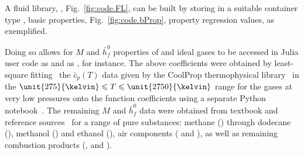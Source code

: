     A fluid library, , Fig.~\ref{fig:code.FL}, can be built by storing in a suitable container type ,  basic  properties,  Fig.~\ref{fig:code.bProp},  property  regression
    values, as exemplified.


    Doing so allows for $M$ and $\bar{h}_f^0$ properties of  and  ideal gases to be accessed in Julia user code as  and as , for  instance.  The
    above    coefficients  were  obtained  by  least-square  fitting~\cite{2007-PressWH+FlanneryBP-Cambridge}  the  $\bar{c}_p(T)$  data  given  by   the   CoolProp   thermophysical
    library~\cite{2014-BellIH+VincentL-IndEngChemR} in the $\unit{275}{\kelvin} \leqslant T \leqslant \unit{2750}{\kelvin}$ range for the gases at  very  low  pressures  onto  the  
    function coefficients using a separate Python~\cite{1995-vanRossumG-CWI} notebook~\cite{2019-Jupyter-www}. The remaining  $M$  and  $\bar{h}_f^0$  data  were  obtained  from  textbook  and
    reference sources~\cite{2013-CengelYA+BolesMA-AMGH, 1985-WylenG-Wiley, 2006-LideDR-CRC} for a range  of  pure  substances:  methane  ()  through  dodecane  (),  methanol
    () and ethanol (), air components ( and ), as well as remaining combustion products (, and ).

